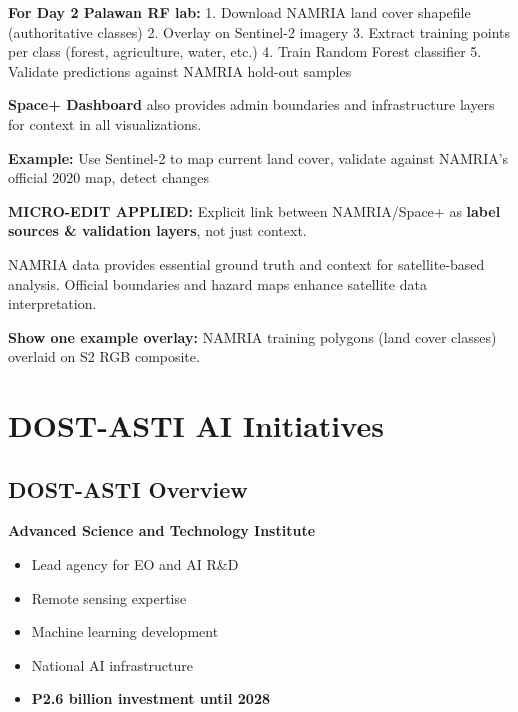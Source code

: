 \documentclass[
  letterpaper,
  DIV=11,
  numbers=noendperiod]{scrartcl}
\providecommand{\tightlist}{%
  \setlength{\itemsep}{0pt}\setlength{\parskip}{0pt}}
\begin{document}
\begin{tcolorbox}[enhanced jigsaw, left=2mm, opacityback=0, toprule=.15mm, breakable, title=\textcolor{quarto-callout-tip-color}{\faLightbulb}\hspace{0.5em}{MICRO-EDIT: Using NAMRIA/Space+ as Label Sources}, colbacktitle=quarto-callout-tip-color!10!white, arc=.35mm, titlerule=0mm, colback=white, bottomtitle=1mm, colframe=quarto-callout-tip-color-frame, leftrule=.75mm, toptitle=1mm, rightrule=.15mm, bottomrule=.15mm, opacitybacktitle=0.6, coltitle=black]

\textbf{For Day 2 Palawan RF lab:} 1. Download NAMRIA land cover
shapefile (authoritative classes) 2. Overlay on Sentinel-2 imagery 3.
Extract training points per class (forest, agriculture, water, etc.) 4.
Train Random Forest classifier 5. Validate predictions against NAMRIA
hold-out samples

\textbf{Space+ Dashboard} also provides admin boundaries and
infrastructure layers for context in all visualizations.

\end{tcolorbox}

\textbf{Example:} Use Sentinel-2 to map current land cover, validate
against NAMRIA's official 2020 map, detect changes

\textbf{MICRO-EDIT APPLIED:} Explicit link between NAMRIA/Space+ as
\textbf{label sources \& validation layers}, not just context.

NAMRIA data provides essential ground truth and context for
satellite-based analysis. Official boundaries and hazard maps enhance
satellite data interpretation.

\textbf{Show one example overlay:} NAMRIA training polygons (land cover
classes) overlaid on S2 RGB composite.

\section{DOST-ASTI AI Initiatives}\label{dost-asti-ai-initiatives}

\subsection{DOST-ASTI Overview}\label{dost-asti-overview}

\textbf{Advanced Science and Technology Institute}

\begin{itemize}
\tightlist
\item
  Lead agency for EO and AI R\&D
\item
  Remote sensing expertise
\item
  Machine learning development
\item
  National AI infrastructure
\item
  \textbf{P2.6 billion investment until 2028}
\end{itemize}
\end{document}
